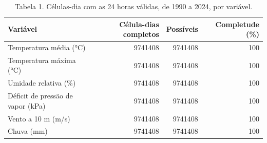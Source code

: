 \begin{table}
\caption{Tabela 1. Células-dia com as 24 horas válidas, de 1990 a 2024, por variável.}
\label{tab:03_clima:tapajos:completude}
\begin{tabular}{lrrr}
\toprule
Variável & Célula-dias completos & Possíveis & Completude (\%) \\
\midrule
Temperatura média (°C) & 9741408 & 9741408 & 100 \\
Temperatura máxima (°C) & 9741408 & 9741408 & 100 \\
Umidade relativa (\%) & 9741408 & 9741408 & 100 \\
Déficit de pressão de vapor (kPa) & 9741408 & 9741408 & 100 \\
Vento a 10 m (m/s) & 9741408 & 9741408 & 100 \\
Chuva (mm) & 9741408 & 9741408 & 100 \\
\bottomrule
\end{tabular}
\end{table}
